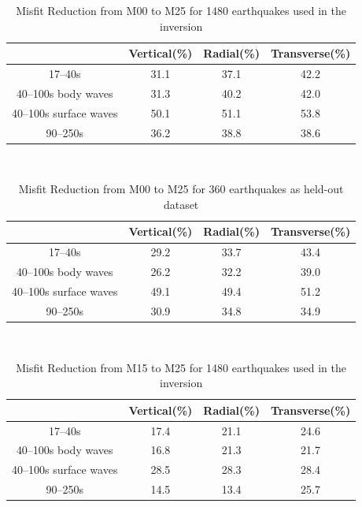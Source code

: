 \documentclass[extra,mreferee]{gji}
\begin{document}
\begin{table}[!htb]
  \centering
  \begin{tabular}{|c|c|c|c|}
    \hline
     ~          &  Vertical(\%) & Radial(\%) &  Transverse(\%) \\
    \hline
    17--40s                &    31.1    &       37.1 &       42.2 \\
    40--100s body waves    &    31.3    &       40.2 &       42.0 \\
    40--100s surface waves &    50.1    &       51.1 &       53.8 \\
    90--250s               &    36.2    &       38.8 &       38.6 \\
    \hline
  \end{tabular}\\
  \caption{Misfit Reduction from M00 to M25 for 1480 earthquakes used in the inversion}
  \label{table:categories}
\end{table}

\begin{table}[!htb]
  \centering
  \begin{tabular}{|c|c|c|c|}
    \hline
    ~          &  Vertical(\%) & Radial(\%) &  Transverse(\%) \\
    \hline
    17--40s                &         29.2 &       33.7 &       43.4 \\
    40--100s body waves    &         26.2 &       32.2 &       39.0 \\
    40--100s surface waves &         49.1 &       49.4 &       51.2 \\
    90--250s               &         30.9 &       34.8 &       34.9 \\
    \hline
  \end{tabular}\\
  \caption{Misfit Reduction from M00 to M25 for 360 earthquakes as held-out dataset}
  \label{table:misfit_reduction_M00_M25_360}
\end{table}

\begin{table}[!htb]
  \centering
  \begin{tabular}{|c|c|c|c|}
    \hline
    ~          &  Vertical(\%) & Radial(\%) &  Transverse(\%) \\
    \hline
    17--40s                &   17.4   &       21.1 &       24.6 \\
    40--100s body waves    &   16.8   &       21.3 &       21.7 \\
    40--100s surface waves &   28.5   &       28.3 &       28.4 \\
    90--250s               &   14.5   &       13.4 &       25.7 \\
    \hline
  \end{tabular}\\
  \label{table:misfit_reduction_M15_M25}
  \caption{Misfit Reduction from M15 to M25 for 1480 earthquakes used in the inversion}
\end{table}
\end{document}
